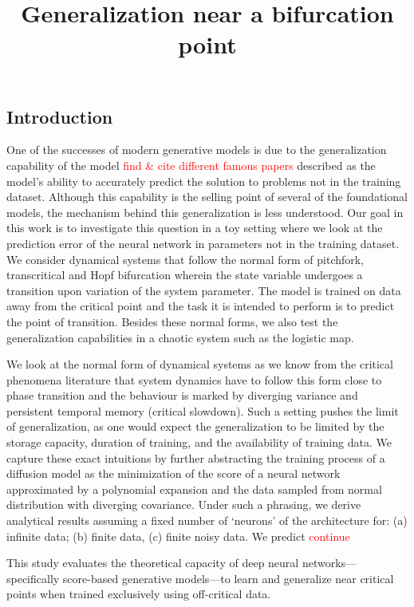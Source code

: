 \documentclass[11pt,a4paper]{article}
\title{\textbf{Generalization near a bifurcation point}}
\author{}
\date{}
\theoremstyle{remark}
\def\sgp#1{{\sf\textcolor{red}{#1}}}
\begin{document}
\maketitle

\begin{onehalfspace}

\section{Introduction}\label{sec:Intro}
One of the successes of modern generative models is due to the generalization capability of the model \sgp{find \& cite different famous papers} described as the model's ability to accurately predict the solution to problems not in the training dataset. Although this capability is the selling point of several of the foundational models, the mechanism behind this generalization is less understood. Our goal in this work is to investigate this question in a toy setting where we look at the prediction error of the neural network in parameters not in the training dataset. We consider dynamical systems that follow the normal form of pitchfork, transcritical and Hopf bifurcation wherein the state variable undergoes a transition upon variation of the system parameter. The model is trained on data away from the critical point and the task it is intended to perform is to predict the point of transition. Besides these normal forms, we also test the generalization capabilities in a chaotic system such as the logistic map.

We look at the normal form of dynamical systems as we know from the critical phenomena literature that system dynamics have to follow this form close to phase transition and the behaviour is marked by diverging variance and persistent temporal memory (critical slowdown). Such a setting pushes the limit of generalization, as one would expect the generalization to be limited by the storage capacity, duration of training, and the availability of training data. We capture these exact intuitions by further abstracting the training process of a diffusion model as the minimization of the score of a neural network approximated by a polynomial expansion and the data sampled from normal distribution with diverging covariance. Under such a phrasing, we derive analytical results assuming a fixed number of `neurons' of the architecture for: (a) infinite data; (b) finite data, (c) finite noisy data. We predict \sgp{continue}

This study evaluates the theoretical capacity of deep neural networks—specifically score-based generative models—to learn and generalize near critical points when trained exclusively using off-critical data.


\end{onehalfspace}
\end{document}
